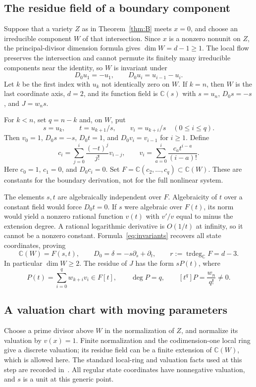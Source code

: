 \documentclass[11pt]{article}
\theoremstyle{remark}\newtheorem{remark}[theorem]{Remark}
\newcommand{\C}{\mathbb C}
\DeclareMathOperator{\trdeg}{trdeg}
\begin{document}
\subsection{The residue field of a boundary component}
Suppose that a variety $Z$ as in Theorem~\ref{thm:B} meets $x=0$, and choose an irreducible component $W$ of that intersection. Since $x$ is a nonzero nonunit on $Z$, the principal-divisor dimension formula gives $\dim W=d-1\geq1$. The local flow preserves the intersection and cannot permute its finitely many irreducible components near the identity, so $W$ is invariant under
\[
 D_0u_1=-u_1,\qquad D_0u_i=u_{i-1}-u_i.
\]
Let $k$ be the first index with $u_k$ not identically zero on $W$. If $k=n$, then $W$ is the last coordinate axis, $d=2$, and its function field is $\C(s)$ with $s=u_n$, $D_0s=-s$, and $J=w_n s$.

For $k<n$, set $q=n-k$ and, on $W$, put
\[
 s=u_k,\qquad t=u_{k+1}/s,\qquad v_i=u_{k+i}/s\quad(0\leq i\leq q).
\]
Then $v_0=1$, $D_0s=-s$, $D_0t=1$, and $D_0v_i=v_{i-1}$ for $i\geq1$. Define
\begin{equation}\label{eq:invariants}
 c_i=\sum_{j=0}^i\frac{(-t)^j}{j!}v_{i-j},\qquad
 v_i=\sum_{a=0}^i\frac{c_a t^{i-a}}{(i-a)!}.
\end{equation}
Here $c_0=1$, $c_1=0$, and $D_0c_i=0$. Set $F=\C(c_2,\ldots,c_q)\subset\C(W)$. These are constants for the boundary derivation, not for the full nonlinear system.

The elements $s,t$ are algebraically independent over $F$. Algebraicity of $t$ over a constant field would force $D_0t=0$. If $s$ were algebraic over $F(t)$, its norm would yield a nonzero rational function $v(t)$ with $v'/v$ equal to minus the extension degree. A rational logarithmic derivative is $O(1/t)$ at infinity, so it cannot be a nonzero constant. Formula~\eqref{eq:invariants} recovers all state coordinates, proving
\begin{equation}\label{eq:residue}
 \C(W)=F(s,t),\qquad D_0=\delta=-s\partial_s+\partial_t,
 \qquad r:=\trdeg_\C F=d-3.
\end{equation}
In particular $\dim W\geq2$. The residue of $J$ has the form $sP(t)$, where
\begin{equation}\label{eq:leadingP}
 P(t)=\sum_{i=0}^q w_{k+i}v_i\in F[t],\qquad
 \deg P=q,\qquad [t^q]P=\frac{w_n}{q!}\ne0.
\end{equation}

\subsection{A valuation chart with moving parameters}\label{sec:valuation}
Choose a prime divisor above $W$ in the normalization of $Z$, and normalize its valuation by $v(x)=1$. Finite normalization and the codimension-one local ring give a discrete valuation; its residue field can be a finite extension of $\C(W)$, which is allowed here. The standard local-ring and valuation facts used at this step are recorded in~\cite{Stacks}. All regular state coordinates have nonnegative valuation, and $s$ is a unit at this generic point.
\end{document}
